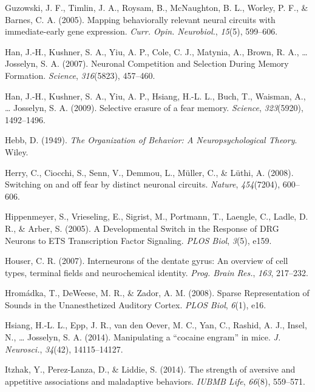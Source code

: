 \documentclass[12pt,a4paper,]{report}
\begin{document}
\hypertarget{ref-guzowskiux5fmappingux5f2005}{}
Guzowski, J. F., Timlin, J. A., Roysam, B., McNaughton, B. L., Worley,
P. F., \& Barnes, C. A. (2005). Mapping behaviorally relevant neural
circuits with immediate-early gene expression. \emph{Curr. Opin.
Neurobiol.}, \emph{15}(5), 599--606.

\hypertarget{ref-hanux5fneuronalux5f2007}{}
Han, J.-H., Kushner, S. A., Yiu, A. P., Cole, C. J., Matynia, A., Brown,
R. A., \ldots{} Josselyn, S. A. (2007). Neuronal Competition and
Selection During Memory Formation. \emph{Science}, \emph{316}(5823),
457--460.

\hypertarget{ref-hanux5fselectiveux5f2009}{}
Han, J.-H., Kushner, S. A., Yiu, A. P., Hsiang, H.-L. L., Buch, T.,
Waisman, A., \ldots{} Josselyn, S. A. (2009). Selective erasure of a
fear memory. \emph{Science}, \emph{323}(5920), 1492--1496.

\hypertarget{ref-hebbux5forganizationux5f1949}{}
Hebb, D. (1949). \emph{The Organization of Behavior: A
Neuropsychological Theory}. Wiley.

\hypertarget{ref-herryux5fswitchingux5f2008-1}{}
Herry, C., Ciocchi, S., Senn, V., Demmou, L., Müller, C., \& Lüthi, A.
(2008). Switching on and off fear by distinct neuronal circuits.
\emph{Nature}, \emph{454}(7204), 600--606.

\hypertarget{ref-hippenmeyerux5fdevelopmentalux5f2005}{}
Hippenmeyer, S., Vrieseling, E., Sigrist, M., Portmann, T., Laengle, C.,
Ladle, D. R., \& Arber, S. (2005). A Developmental Switch in the
Response of DRG Neurons to ETS Transcription Factor Signaling.
\emph{PLOS Biol}, \emph{3}(5), e159.

\hypertarget{ref-houserux5finterneuronsux5f2007}{}
Houser, C. R. (2007). Interneurons of the dentate gyrus: An overview of
cell types, terminal fields and neurochemical identity. \emph{Prog.
Brain Res.}, \emph{163}, 217--232.

\hypertarget{ref-hromadkaux5fsparseux5f2008}{}
Hromádka, T., DeWeese, M. R., \& Zador, A. M. (2008). Sparse
Representation of Sounds in the Unanesthetized Auditory Cortex.
\emph{PLOS Biol}, \emph{6}(1), e16.

\hypertarget{ref-hsiangux5fmanipulatingux5f2014}{}
Hsiang, H.-L. L., Epp, J. R., van den Oever, M. C., Yan, C., Rashid, A.
J., Insel, N., \ldots{} Josselyn, S. A. (2014). Manipulating a ``cocaine
engram'' in mice. \emph{J. Neurosci.}, \emph{34}(42), 14115--14127.

\hypertarget{ref-itzhakux5fstrengthux5f2014}{}
Itzhak, Y., Perez-Lanza, D., \& Liddie, S. (2014). The strength of
aversive and appetitive associations and maladaptive behaviors.
\emph{IUBMB Life}, \emph{66}(8), 559--571.
\end{document}
